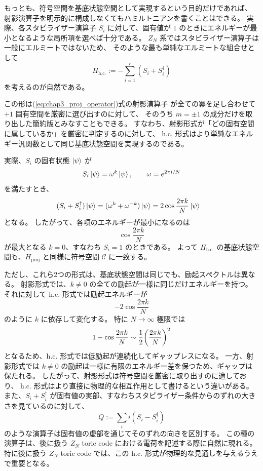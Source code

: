 \documentclass[../master.tex]{subfiles}
\begin{document}
もっとも、符号空間を基底状態空間として実現するという目的だけであれば、
射影演算子を明示的に構成しなくてもハミルトニアンを書くことはできる。
実際、各スタビライザー演算子 $S_i$ に対して、固有値が $1$ のときにエネルギーが最小となるような局所項を選べば十分である。
$Z_N$ 系ではスタビライザー演算子は一般にエルミートではないため、
そのような最も単純なエルミートな組合せとして
\begin{equation}
    H_{\mathrm{h.c.}} := -\sum_{i=1}^r (S_i+S_i^\dagger)
\end{equation}
を考えるのが自然である。

この形は(\ref{eq:chap3_proj_operator})式の射影演算子
が全ての冪を足し合わせて $+1$ 固有空間を厳密に選び出すのに対して、
そのうち $m=\pm 1$ の成分だけを取り出した簡約版とみなすこともできる。
すなわち、射影形式が「どの固有空間に属しているか」を厳密に判定するのに対して、
$\text{h.c.}$ 形式はより単純なエネルギー汎関数として同じ基底状態空間を実現するのである。

実際、$S_i$ の固有状態 $\ket{\psi}$ が
\begin{equation}
    S_i\ket{\psi}=\omega^k\ket{\psi},\qquad \omega=e^{2\pi i/N}
\end{equation}
を満たすとき、
\begin{equation}\begin{aligned}[b]
    (S_i+S_i^\dagger)\ket{\psi}
    &= (\omega^k+\omega^{-k})\ket{\psi}
    = 2\cos\frac{2\pi k}{N}\ket{\psi}
\end{aligned}\end{equation}
となる。
したがって、各項のエネルギーが最小になるのは
\begin{equation}
    \cos\frac{2\pi k}{N}
\end{equation}
が最大となる $k=0$、すなわち $S_i=1$ のときである。
よって $H_{\mathrm{h.c.}}$ の基底状態空間も、$H_{\mathrm{proj}}$ と同様に符号空間 $\mathcal{C}$ に一致する。

ただし、これら2つの形式は、基底状態空間は同じでも、励起スペクトルは異なる。
射影形式では、$k\neq 0$ の全ての励起が一様に同じだけエネルギーを持つ。
それに対して $\text{h.c.}$ 形式では励起エネルギーが
\begin{equation}
    -2\cos\frac{2\pi k}{N}
\end{equation}
のように $k$ に依存して変化する。
特に $N\to\infty$ 極限では
\begin{equation}
    1-\cos\frac{2\pi k}{N}\sim \frac{1}{2}\qty(\frac{2\pi k}{N})^2
\end{equation}
となるため、$\text{h.c.}$ 形式では低励起が連続化してギャップレスになる。
一方、射影形式では $k\neq 0$ の励起は一様に有限のエネルギー差を保つため、ギャップは保たれる。
したがって、射影形式は符号空間を厳密に取り出すのに適しており、
$\text{h.c.}$ 形式はより直接に物理的な相互作用として書けるという違いがある。
また、$S_i+S_i^\dagger$ が固有値の実部、すなわちスタビライザー条件からのずれの大きさを見ているのに対して、
\begin{equation}
    Q:=\sum_i i(S_i-S_i^\dagger)
\end{equation}
のような演算子は固有値の虚部を通じてそのずれの向きを区別する。
この種の演算子は、後に扱う $Z_N$ toric code における電荷を記述する際に自然に現れる。
特に後に扱う $Z_N$ toric code では、この $\text{h.c.}$ 形式が物理的な見通しを与えるうえで重要となる。
\end{document}

